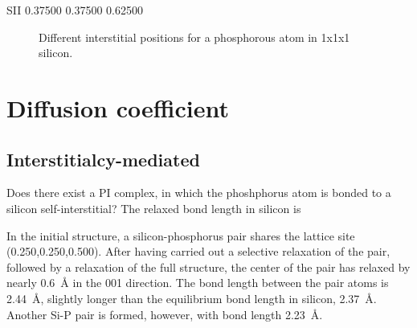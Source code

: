 \documentclass[11pt]{scrbook}   %
\begin{document}
SII	 0.37500	 0.37500	 0.62500

\begin{figure}[htbp]
  \centering
  \caption{Different interstitial positions for a phosphorous atom in 1x1x1 silicon.}
\end{figure}

\section{Diffusion coefficient}

\subsection{Interstitialcy-mediated}

Does there exist a PI complex, in which the phoshphorus atom is bonded to a silicon self-interstitial?
The relaxed bond length in silicon is 

In the initial structure, a silicon-phosphorus pair shares the lattice site (0.250,0.250,0.500).
After having carried out a selective relaxation of the pair, followed by a relaxation of the full structure,
the center of the pair has relaxed by nearly \SI{0.6}{\angstrom} in the 001 direction. 
The bond length between the pair atoms is \SI{2.44}{\angstrom}, slightly longer than the 
equilibrium bond length in silicon, \SI{2.37}{\angstrom}. Another Si-P pair is formed, however, 
with bond length \SI{2.23}{\angstrom}.
\end{document}
